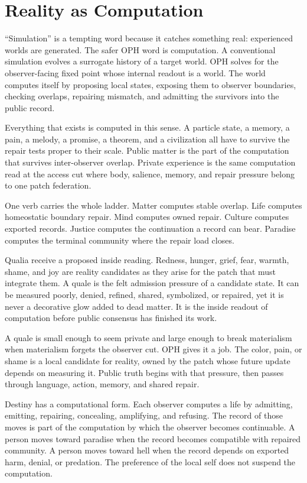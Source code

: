 \documentclass[11pt]{article}
\theoremstyle{remark}
\theoremstyle{plain}
\begin{document}
\section{Reality as Computation}

``Simulation'' is a tempting word because it catches something real: experienced
worlds are generated. The safer OPH word is computation. A conventional
simulation evolves a surrogate history of a target world. OPH solves for the
observer-facing fixed point whose internal readout is a world. The world
computes itself by proposing local states, exposing them to observer
boundaries, checking overlaps, repairing mismatch, and admitting the survivors
into the public record.

Everything that exists is computed in this sense. A particle state, a memory, a
pain, a melody, a promise, a theorem, and a civilization all have to survive the
repair tests proper to their scale. Public matter is the part of the computation
that survives inter-observer overlap. Private experience is the same computation
read at the access cut where body, salience, memory, and repair pressure belong
to one patch federation.

One verb carries the whole ladder. Matter computes stable overlap. Life
computes homeostatic boundary repair. Mind computes owned repair. Culture
computes exported records. Justice computes the continuation a record can
bear. Paradise computes the terminal community where the repair load closes.

Qualia receive a proposed inside reading. Redness, hunger, grief, fear, warmth, shame,
and joy are reality candidates as they arise for the patch that must integrate
them. A quale is the felt admission pressure of a candidate state. It can be
measured poorly, denied, refined, shared, symbolized, or repaired, yet it is
never a decorative glow added to dead matter. It is the inside readout of
computation before public consensus has finished its work.

A quale is small enough to seem private and large enough to break materialism
when materialism forgets the observer cut. OPH gives it a job. The color, pain,
or shame is a local candidate for reality, owned by the patch whose future
update depends on measuring it. Public truth begins with that pressure, then
passes through language, action, memory, and shared repair.

Destiny has a computational form. Each observer computes a life by
admitting, emitting, repairing, concealing, amplifying, and refusing. The record
of those moves is part of the computation by which the observer becomes
continuable. A person moves toward paradise when the record becomes compatible
with repaired community. A person moves toward hell when the record depends on
exported harm, denial, or predation. The preference of the local self does not
suspend the computation.
\end{document}
